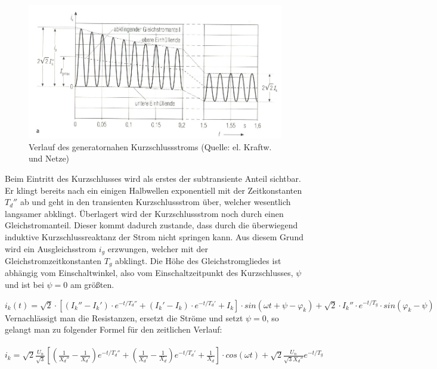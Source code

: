 \documentclass{scrartcl}
\begin{document}
\begin{onehalfspace}
	\begin{figure}[H]
	\centering
	\includegraphics[scale=1.2]{img/kurzschlussstromverlauf-nah.jpg}
	\caption{Verlauf des generatornahen Kurzschlussstroms (Quelle: el. Kraftw. und Netze)}
	\label{kss-verlauf-nah}
	\end{figure}

Beim Eintritt des Kurzschlusses wird als erstes der subtransiente Anteil sichtbar. Er klingt bereits nach ein einigen Halbwellen exponentiell mit der Zeitkonstanten $T_d''$ ab und geht in den transienten Kurzschlussstrom über, welcher wesentlich langsamer abklingt. Überlagert wird der Kurzschlussstrom noch durch einen Gleichstromanteil. Dieser kommt dadurch zustande, dass durch die überwiegend induktive Kurzschlussreaktanz der Strom nicht \glqq springen\grqq{} kann. Aus diesem Grund wird ein Ausgleichsstrom $i_g$ erzwungen, welcher mit der Gleichstromzeitkonstanten $T_g$ abklingt. Die Höhe des Gleichstromgliedes ist abhängig vom Einschaltwinkel, also vom Einschaltzeitpunkt des Kurzschlusses, $\psi$ und ist bei $\psi = 0$ am größten.

$i_k(t) = \sqrt{2} \cdot [(I_k'' - I_k') \cdot e^{-t/T_d''} + (I_k' - I_k) \cdot e^{-t/T_d'} + I_k] \cdot sin(\omega t + \psi - \varphi_k) + \sqrt{2} \cdot I_k'' \cdot e^{-t/T_g} \cdot sin( \varphi_k - \psi) $ \\


Vernachlässigt man die Resistanzen, ersetzt die Ströme und setzt $\psi = 0$, so gelangt man zu folgender Formel für den zeitlichen Verlauf: \\ \\
$i_k = \sqrt{2} \frac{U_n}{\sqrt{3}} [(\frac{1}{X_d''} - \frac{1}{X_d'}) e^{-t/T_d''} + (\frac{1}{X_d'} - \frac{1}{X_d}) e^{-t/T_d'} + \frac{1}{X_d}] \cdot cos(\omega t) + \sqrt{2} \frac{U_n}{\sqrt{3} X_d''} e^{-t/T_g}$ \\


\end{onehalfspace}
\end{document}
